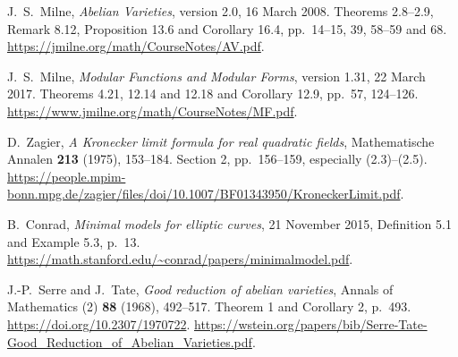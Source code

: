 J.~S.~Milne, \emph{Abelian Varieties}, version 2.0, 16 March 2008.
Theorems 2.8--2.9, Remark 8.12, Proposition 13.6 and Corollary 16.4,
pp.~14--15, 39, 58--59 and 68.
\url{https://jmilne.org/math/CourseNotes/AV.pdf}.

J.~S.~Milne, \emph{Modular Functions and Modular Forms},
version 1.31, 22 March 2017.
Theorems 4.21, 12.14 and 12.18 and Corollary 12.9,
pp.~57, 124--126.
\url{https://www.jmilne.org/math/CourseNotes/MF.pdf}.

D.~Zagier, \emph{A Kronecker limit formula for real quadratic fields},
Mathematische Annalen \textbf{213} (1975), 153--184.
Section 2, pp.~156--159, especially (2.3)--(2.5).
\url{https://people.mpim-bonn.mpg.de/zagier/files/doi/10.1007/BF01343950/KroneckerLimit.pdf}.

B.~Conrad, \emph{Minimal models for elliptic curves},
21 November 2015, Definition 5.1 and Example 5.3, p.~13.
\url{https://math.stanford.edu/~conrad/papers/minimalmodel.pdf}.

J.-P.~Serre and J.~Tate, \emph{Good reduction of abelian varieties},
Annals of Mathematics (2) \textbf{88} (1968), 492--517.
Theorem 1 and Corollary 2, p.~493.
\url{https://doi.org/10.2307/1970722}.
\url{https://wstein.org/papers/bib/Serre-Tate-Good_Reduction_of_Abelian_Varieties.pdf}.
